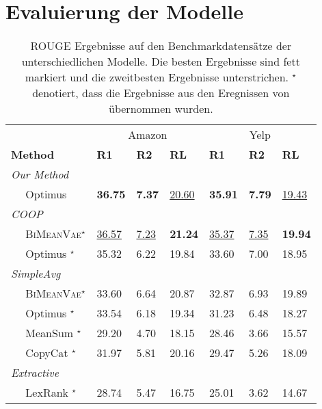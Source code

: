 \section{Evaluierung der Modelle}\raggedbottom

\begin{table}[]
    \centering
    \begin{tabular}{@{}lllllll@{}}
    \toprule
                               & \multicolumn{3}{c}{Amazon} & \multicolumn{3}{c}{Yelp} \\ 
    \textbf{Method} & \textbf{R1} & \textbf{R2} & \textbf{RL} & \textbf{R1} & \textbf{R2} & \textbf{RL} \\ \midrule
    \textit{Our Method}        &         &         &        &        &        &        \\
    $\quad$ Optimus            &     \textbf{36.75}    &   \textbf{7.37}      &     \underline{20.60}   &   \textbf{35.91}   &   \textbf{7.79}       & \underline{19.43}       \\ \midrule
    \textit{COOP}              &         &         &        &        &        &        \\
    $\quad$ \textsc{BiMeanVae}$^{\star}$ & \underline{36.57}    & \underline{7.23}   & \textbf{21.24}  & \underline{35.37}  & \underline{7.35}  & \textbf{19.94}  \\
    $\quad$ Optimus $^{\star}$           & 35.32   & 6.22    & 19.84  & 33.60  & 7.00   & 18.95  \\ \midrule
    \textit{SimpleAvg}         &         &         &        &        &        &        \\
    $\quad$ \textsc{BiMeanVae}$^{\star}$ & 33.60   & 6.64    & 20.87  & 32.87  & 6.93   & 19.89  \\
    $\quad$ Optimus  $^{\star}$          & 33.54   & 6.18    & 19.34  & 31.23  & 6.48   & 18.27  \\
    $\quad$ MeanSum  $^{\star}$          & 29.20   & 4.70    & 18.15  & 28.46  & 3.66   & 15.57  \\
    $\quad$ CopyCat  $^{\star}$          & 31.97   & 5.81    & 20.16  & 29.47  & 5.26   & 18.09  \\ \midrule
    \textit{Extractive}        &         &         &        &        &        &        \\
    $\quad$ LexRank  $^{\star}$          & 28.74   & 5.47    & 16.75  & 25.01  & 3.62   & 14.67  \\ \bottomrule
    \end{tabular}
    \caption{ROUGE Ergebnisse auf den Benchmarkdatensätze der unterschiedlichen Modelle. Die besten Ergebnisse sind fett markiert und die zweitbesten Ergebnisse unterstrichen.
    $^{\star}$ denotiert, dass die Ergebnisse aus den Eregnissen von \citep{coop} übernommen wurden.}
\end{table}

\pagebreak
